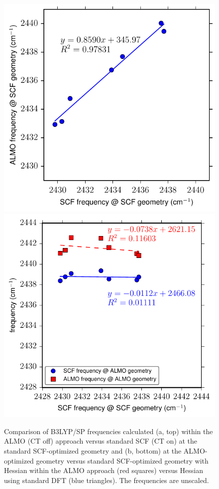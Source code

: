 \documentclass[%
  class = book,%
  crop = false,%
  float = true,%
  multi = true,%
  preview = false,%
]{standalone}
\begin{document}
\begin{figure}
  \centering
  \includegraphics[scale=0.91]{Fig2a.pdf}
  \includegraphics[scale=0.91]{Fig2b.pdf}
  \caption[Correlation of \texorpdfstring{ \(\nu_3\)}{carbon dioxide asymmetric stretch} frequencies with CT mechanisms]{Comparison of B3LYP/SP frequencies calculated (a, top) within the ALMO (CT off) approach versus standard SCF (CT on) at the standard SCF-optimized geometry and (b, bottom) at the ALMO-optimized geometry versus standard SCF-optimized geometry with Hessian within the ALMO approach (red squares) versus Hessian using standard DFT (blue triangles). The frequencies are unscaled.}
  \label{paper_02:fig:2}
\end{figure}
\end{document}
